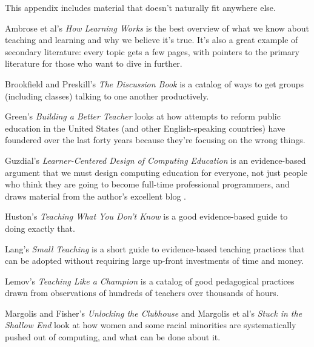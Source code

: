 
This appendix includes material that doesn't naturally fit anywhere else.


\begin{gitemize}

\item
  Ambrose et al's \emph{How Learning Works} \cite{bib:ambrose-hlw} is
  the best overview of what we know about teaching and learning and
  why we believe it's true.  It's also a great example of secondary
  literature: every topic gets a few pages, with pointers to the
  primary literature for those who want to dive in further.

\item
  Brookfield and Preskill's \emph{The Discussion Book}
  \cite{bib:preskill-discussion} is a catalog of ways to get groups
  (including classes) talking to one another productively.

\item
  Green's \emph{Building a Better Teacher} \cite{bib:green-babt} looks
  at how attempts to reform public education in the United States (and
  other English-speaking countries) have foundered over the last forty
  years because they're focusing on the wrong things.

\item
  Guzdial's \emph{Learner-Centered Design of Computing Education}
  \cite{bib:guzdial-lcd} is an evidence-based argument that we must
  design computing education for everyone, not just people who think
  they are going to become full-time professional programmers, and
  draws material from the author's excellent blog \cite{bib:guzdial-blog}.

\item
  Huston's \emph{Teaching What You Don't Know}
  \cite{bib:huston-dont-know} is a good evidence-based guide to doing
  exactly that.

\item
  Lang's \emph{Small Teaching} \cite{bib:lang-small-teaching} is a
  short guide to evidence-based teaching practices that can be adopted
  without requiring large up-front investments of time and money.

\item
  Lemov's \emph{Teaching Like a Champion} \cite{bib:lemov-champion} is
  a catalog of good pedagogical practices drawn from observations of
  hundreds of teachers over thousands of hours.

\item
  Margolis and Fisher's \emph{Unlocking the Clubhouse}
  \cite{bib:margolis-fisher-clubhouse} and Margolis et al's
  \emph{Stuck in the Shallow End} \cite{bib:margolis-shallow} look at
  how women and some racial minorities are systematically pushed out
  of computing, and what can be done about it.

\end{gitemize}

